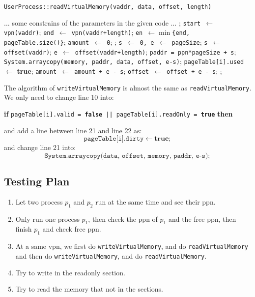 \documentclass{article}
\begin{document}
\begin{spacing}{1.1}
\begin{algorithm}[htbp]
  \caption{\texttt{UserProcess::readVirtualMemory(vaddr, data, offset, length)}}
  \begin{algorithmic}[1]
    \STATE $\dots$ some constrains of the parameters in the given code $\dots$ 
    ;
    \ENDIF
    \STATE \texttt{start $\gets$  vpn(vaddr)};
    \STATE \texttt{end $\gets$  vpn(vaddr+length)};
    \STATE \texttt{en $\gets \min$\{end, pageTable.size()\}};
    \STATE \texttt{amount $\gets$  0};
    ;
    \ENDIF
    \STATE \texttt{s $\gets$ 0, e $\gets$ pageSize};
    \STATE \texttt{s $\gets$  offset(vaddr)};
    \ENDIF
    \STATE \texttt{e $\gets$  offset(vaddr+length)};
    \ENDIF
    \STATE \texttt{paddr = ppn*pageSize + s};
    \STATE \texttt{System.arraycopy(memory, paddr, data, offset, e-s)};
    \STATE \texttt{pageTable[i].used $\gets$}  \textbf{true};
    \STATE \texttt{amount  $\gets$  amount + e - s};
    \STATE \texttt{offset  $\gets$  offset + e - s};
    \ENDFOR
    ;
  \end{algorithmic}
\end{algorithm} 
The algorithm of \texttt{writeVirtualMemory} is almost the same as 
\texttt{readVirtualMemory}.
We only need to change line 10 into: \\
\begin{center}
  \textbf{if} \texttt{pageTable[i].valid = \textbf{false} || pageTable[i].readOnly = 
  \textbf{true}} \textbf{then}
\end{center}
and add a line between line 21 and line 22 as: 
\[ \texttt{pageTable[i].dirty}  \gets  \textbf{true}; \]
and change line 21 into: \\
\[ \texttt{System.arraycopy(data, offset, memory, paddr, e-s)}; \]


\subsection{Testing Plan}
\begin{enumerate}[$\bullet$]
  \item Let two process $p_1$ and $p_2$ run at the same time and see
    their ppn.
  \item Only run one process $p_1$, then check the ppn of $p_1$
    and the free ppn, then finish $p_1$ and check free ppn.
  \item At a same vpn, we first do \texttt{writeVirtualMemory},
    and do \texttt{readVirtualMemory} and then do \texttt{writeVirtualMemory},
    and do \texttt{readVirtualMemory}.
  \item Try to write in the readonly section.
  \item Try to read the memory that not in the sections.
\end{enumerate}




\end{spacing}
\end{document}
